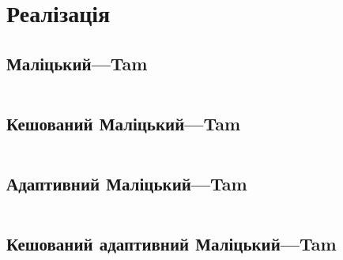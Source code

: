 \section{Реалізація}

\subsection{Маліцький---Tam}
\inputminted[linenos,fontsize=\tiny]{python}{src/malitsky_tam.py}
\newpage

\subsection{Кешований Маліцький---Tam}
\inputminted[linenos,fontsize=\tiny]{python}{src/cached_malitsky_tam.py}
\newpage

\subsection{Адаптивний Маліцький---Tam}
\inputminted[linenos,fontsize=\tiny]{python}{src/adaptive_malitsky_tam.py}
\newpage

\subsection{Кешований адаптивний Маліцький---Tam}
\inputminted[linenos,fontsize=\tiny]{python}{src/cached_adaptive_malitsky_tam.py}
\newpage